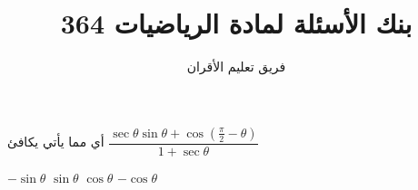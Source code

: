 \documentclass{exam}
\title{\textarabic{بنك الأسئلة لمادة الرياضيات 364}}
\author{\textarabic{فريق تعليم الأقران}}
\begin{document}
\maketitle
\begin{RTL}
\question \textarabic{أي مما يأتي يكافئ} $\dfrac{\sec\theta\sin\theta + \cos\left(\frac{\pi}{2} - \theta\right)}{1 + \sec\theta}$

\begin{choices}
    \choice $-\sin\theta$
    \choice $\sin\theta$
    \choice $\cos\theta$
    \choice $-\cos\theta$
\end{choices}
\end{RTL}
\end{document}
